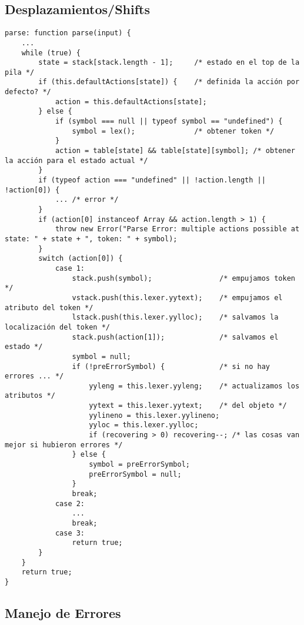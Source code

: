 \subsection{Desplazamientos/Shifts}

\begin{verbatim}
parse: function parse(input) {
    ...
    while (true) {
        state = stack[stack.length - 1];     /* estado en el top de la pila */
        if (this.defaultActions[state]) {    /* definida la acción por defecto? */
            action = this.defaultActions[state];
        } else {
            if (symbol === null || typeof symbol == "undefined") {
                symbol = lex();              /* obtener token */
            }
            action = table[state] && table[state][symbol]; /* obtener la acción para el estado actual */
        }
        if (typeof action === "undefined" || !action.length || !action[0]) { 
            ... /* error */
        }
        if (action[0] instanceof Array && action.length > 1) {
            throw new Error("Parse Error: multiple actions possible at state: " + state + ", token: " + symbol);
        }
        switch (action[0]) {
            case 1:
                stack.push(symbol);                /* empujamos token */
                vstack.push(this.lexer.yytext);    /* empujamos el atributo del token */
                lstack.push(this.lexer.yylloc);    /* salvamos la localización del token */
                stack.push(action[1]);             /* salvamos el estado */
                symbol = null;
                if (!preErrorSymbol) {             /* si no hay errores ... */
                    yyleng = this.lexer.yyleng;    /* actualizamos los atributos */
                    yytext = this.lexer.yytext;    /* del objeto */
                    yylineno = this.lexer.yylineno;
                    yyloc = this.lexer.yylloc;
                    if (recovering > 0) recovering--; /* las cosas van mejor si hubieron errores */
                } else {
                    symbol = preErrorSymbol;
                    preErrorSymbol = null;
                }
                break;
            case 2:
                ...
                break;
            case 3:
                return true;
        }
    }
    return true;
}
\end{verbatim}

\subsection{Manejo de Errores}

